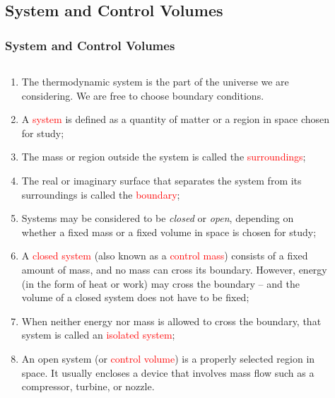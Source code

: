 \documentclass[10pt,compress]{beamer}
\begin{document}
\subsection{System and Control Volumes} 

\scriptsize
\begin{frame}
 \frametitle{System and Control Volumes}
  \begin{columns}
    \begin{column}[l]{0.6\linewidth}
      \begin{enumerate}%
       \item <1-> The thermodynamic system is the part of the universe we are considering. We are free to choose boundary conditions.
       \item <2-> A \textcolor{red}{system} is defined as a quantity of matter or a region in space chosen for study;
       \item <3-> The mass or region outside the system is called the \textcolor{red}{surroundings};
       \item <4-> The real or imaginary surface that separates the system from its surroundings is called the \textcolor{red}{boundary};
       \item <5-> Systems may be considered to be {\it closed} or {\it open}, depending on whether a fixed mass or a fixed volume in space is chosen for study; 
       \item <6-> A \textcolor{red}{closed system} (also known as a \textcolor{red}{control mass}) consists of a fixed amount of mass, and no mass can cross its boundary. However, energy (in the form of heat or work) may cross the boundary -- and the volume of a closed system does not have to be fixed; 
       \item <7-> When neither energy nor mass is allowed to cross the boundary, that system is called an \textcolor{red}{isolated system};
       \item <8-> An open system (or \textcolor{red}{control volume}) is a properly selected region in space. It usually encloses a device that involves mass flow such as a compressor, turbine, or nozzle.
      \end{enumerate} 
    \end{column}
    \begin{column}[l]{0.4\linewidth}\scriptsize
      \begin{figure}%
        \begin{center}

\end{center}
\end{figure}
\end{column}
\end{columns}
\end{frame}
\end{document}
